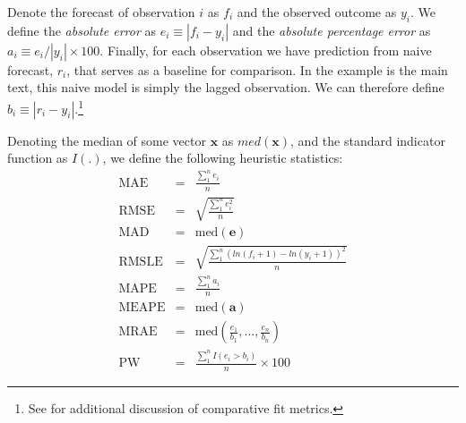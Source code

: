 \documentclass[12pt,fullpage,endnotes]{article}
\begin{document}
Denote the forecast of observation $i$ as $f_i$ and the observed
outcome as $y_i$.  We define the \textit{absolute error} as $e_i\equiv |f_i - y_i|$ and the \textit{absolute percentage error} as $a_i \equiv e_i / |y_i| \times 100$.  Finally, for each observation we have prediction from naive forecast, $r_i$, that serves as a baseline for comparison.  In the example is the main text, this naive model is simply the lagged observation.  We can therefore define $b_i \equiv |r_i - y_i|$.\footnote{See \citet{brandt:freeman:schrodt:2011} for additional discussion of comparative fit metrics.}

Denoting the median of some vector $\mathbf{x}$ as $med(\mathbf{x})$, and the standard indicator function as $I(.)$, we define the following heuristic statistics:
 \begin{eqnarray*}
 \mathrm{MAE} &=& \frac{\sum_1^n{e_i}}{n}\\
  \mathrm{RMSE} &=& \sqrt{\frac{\sum_1^n{e^2_i}}{n}} \\
  \mathrm{MAD} &=& \mathrm{med}(\mathbf{e}) \\
  \mathrm{RMSLE} &=& \sqrt{\frac{\sum_1^n\left(ln(f_i+1) - ln(y_i+1)  \right)^2}{n}} \\
  \mathrm{MAPE} &=& \frac{\sum_1^n{a_i}}{n} \\
   \mathrm{MEAPE} &=& \mathrm{med}(\mathbf{a}) \\
 \mathrm{MRAE} &=& \mathrm{med}\left(\frac{e_1}{b_1}, \ldots, \frac{e_n}{b_n} \right) \\
 \mathrm{PW} &=& \frac{\sum_1^nI(e_i > b_i)}{n} \times 100
\end{eqnarray*}
\end{document}
